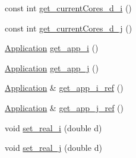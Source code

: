 \begin{DoxyCompactItemize}
\item 
const int \hyperlink{classCandidate__pair_a98ed7825fa11908514e7cfcc99013e4a}{get\-\_\-current\-Cores\-\_\-d\-\_\-i} ()
\item 
const int \hyperlink{classCandidate__pair_a6e597198ca612c1d3c610edb38b395a0}{get\-\_\-current\-Cores\-\_\-d\-\_\-j} ()
\item 
\hyperlink{classApplication}{Application} \hyperlink{classCandidate__pair_a48fd777a95c35ebb45c9d7a241cfa962}{get\-\_\-app\-\_\-i} ()
\item 
\hyperlink{classApplication}{Application} \hyperlink{classCandidate__pair_a68d1dec30fcbfd265355a980c0d01d63}{get\-\_\-app\-\_\-j} ()
\item 
\hyperlink{classApplication}{Application} \& \hyperlink{classCandidate__pair_a4d108cca57baeb0c7df2f4a527ac8692}{get\-\_\-app\-\_\-i\-\_\-ref} ()
\item 
\hyperlink{classApplication}{Application} \& \hyperlink{classCandidate__pair_ae322ed41aa4660ba68d272a4c1d7f9f9}{get\-\_\-app\-\_\-j\-\_\-ref} ()
\item 
void \hyperlink{classCandidate__pair_aee6e0ca68882feefe44c6f095961a8d7}{set\-\_\-real\-\_\-i} (double d)
\item 
void \hyperlink{classCandidate__pair_a9277d72b649e1cdd857fcb42d6926da1}{set\-\_\-real\-\_\-j} (double d)
\end{DoxyCompactItemize}

